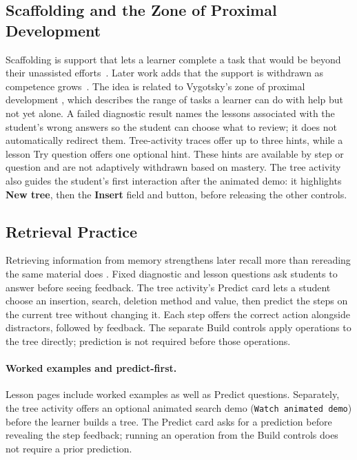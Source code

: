 \subsection{Scaffolding and the Zone of Proximal Development}
Scaffolding is support that lets a learner complete a task that would be
beyond their unassisted efforts~\cite{Wood1976}. Later work adds that the
support is withdrawn as competence grows~\cite{VanDePol2010}. The idea is related to Vygotsky's zone of proximal development \cite{vygotsky1978mind}, which describes the range of tasks a learner can do with help but not yet alone. A failed diagnostic result names the lessons associated with the student's wrong answers so the student can choose what to review; it does not automatically redirect them. Tree-activity traces offer up to three hints, while a lesson Try question offers one optional hint. These hints are available by step or question and are not adaptively withdrawn based on mastery. The tree activity also guides the student's first interaction after the animated demo: it highlights \textbf{New tree}, then the \textbf{Insert} field and button, before releasing the other controls.

\subsection{Retrieval Practice}
Retrieving information from memory strengthens later recall more than rereading the same material does \cite{Roediger2006}. Fixed diagnostic and lesson questions ask students to answer before seeing feedback. The tree activity's Predict card lets a student choose an insertion, search, deletion method and value, then predict the steps on the current tree without changing it. Each step offers the correct action alongside distractors, followed by feedback. The separate Build controls apply operations to the tree directly; prediction is not required before those operations.

\paragraph{Worked examples and predict-first.} Lesson pages include worked examples as well as Predict questions. Separately, the tree activity offers an optional animated search demo (\texttt{Watch animated demo}) before the learner builds a tree. The Predict card asks for a prediction before revealing the step feedback; running an operation from the Build controls does not require a prior prediction.

